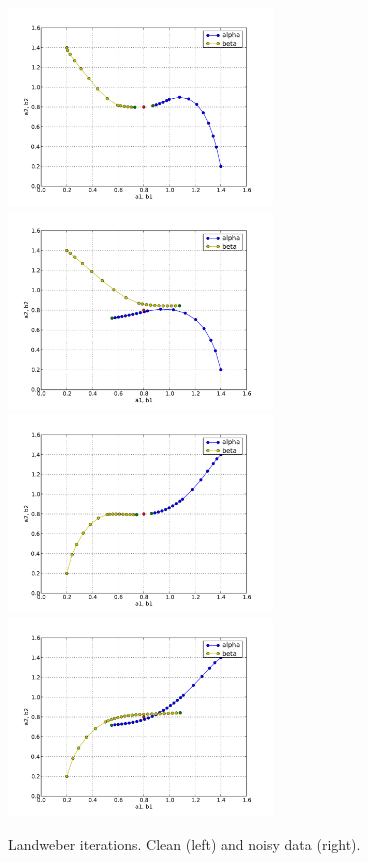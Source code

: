 \begin{figure}
\begin{center}
    \includegraphics[width=7cm]{chapters/schroll/pdf/4Dscan3.pdf}
    \includegraphics[width=7cm]{chapters/schroll/pdf/4Dscan3-5.pdf}
    \includegraphics[width=7cm]{chapters/schroll/pdf/4Dscan4.pdf}
    \includegraphics[width=7cm]{chapters/schroll/pdf/4Dscan4-5.pdf}
    \vspace{-0.7cm}
    \caption{Landweber iterations. Clean (left) and noisy data (right).}
    \label{fig3}
  \end{center}
\end{figure}


